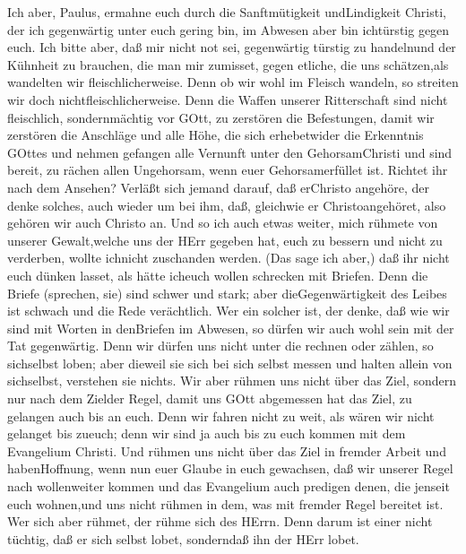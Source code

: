  Ich aber, Paulus, ermahne euch durch die Sanftmütigkeit
undLindigkeit Christi, der ich gegenwärtig unter euch gering bin, im
Abwesen aber bin ichtürstig gegen euch.  Ich bitte aber, daß
mir nicht not sei, gegenwärtig türstig zu handelnund der Kühnheit zu
brauchen, die man mir zumisset, gegen etliche, die uns schätzen,als
wandelten wir fleischlicherweise.  Denn ob wir wohl im
Fleisch wandeln, so streiten wir doch nichtfleischlicherweise.
 Denn die Waffen unserer Ritterschaft sind nicht
fleischlich, sondernmächtig vor GOtt, zu zerstören die Befestungen,
 damit wir zerstören die Anschläge und alle Höhe, die sich
erhebetwider die Erkenntnis GOttes und nehmen gefangen alle Vernunft
unter den GehorsamChristi  und sind bereit, zu rächen allen
Ungehorsam, wenn euer Gehorsamerfüllet ist.  Richtet ihr
nach dem Ansehen? Verläßt sich jemand darauf, daß erChristo angehöre,
der denke solches, auch wieder um bei ihm, daß, gleichwie er
Christoangehöret, also gehören wir auch Christo an.  Und so
ich auch etwas weiter, mich rühmete von unserer Gewalt,welche uns der
HErr gegeben hat, euch zu bessern und nicht zu verderben, wollte
ichnicht zuschanden werden.  (Das sage ich aber,) daß ihr
nicht euch dünken lasset, als hätte icheuch wollen schrecken mit
Briefen.  Denn die Briefe (sprechen, sie) sind schwer und
stark; aber dieGegenwärtigkeit des Leibes ist schwach und die Rede
verächtlich.  Wer ein solcher ist, der denke, daß wie wir
sind mit Worten in denBriefen im Abwesen, so dürfen wir auch wohl sein
mit der Tat gegenwärtig.  Denn wir dürfen uns nicht unter
die rechnen oder zählen, so sichselbst loben; aber dieweil sie sich bei
sich selbst messen und halten allein von sichselbst, verstehen sie
nichts.  Wir aber rühmen uns nicht über das Ziel, sondern
nur nach dem Zielder Regel, damit uns GOtt abgemessen hat das Ziel, zu
gelangen auch bis an euch.  Denn wir fahren nicht zu weit,
als wären wir nicht gelanget bis zueuch; denn wir sind ja auch bis zu
euch kommen mit dem Evangelium Christi.  Und rühmen uns
nicht über das Ziel in fremder Arbeit und habenHoffnung, wenn nun euer
Glaube in euch gewachsen, daß wir unserer Regel nach wollenweiter kommen
 und das Evangelium auch predigen denen, die jenseit euch
wohnen,und uns nicht rühmen in dem, was mit fremder Regel bereitet ist.
 Wer sich aber rühmet, der rühme sich des HErrn.
 Denn darum ist einer nicht tüchtig, daß er sich selbst
lobet, sonderndaß ihn der HErr lobet.

